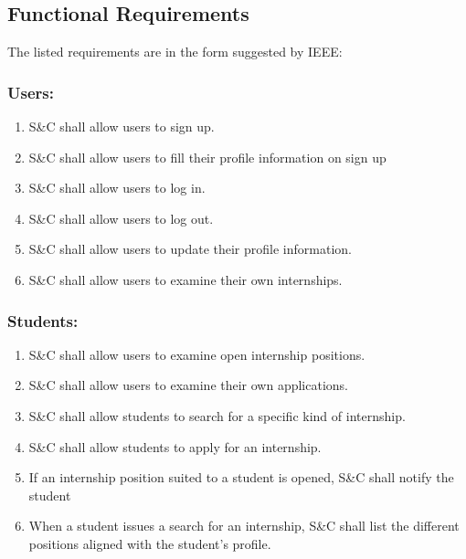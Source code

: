 \subsection{Functional Requirements}
    The listed requirements are in the form suggested by IEEE\cite{502838}: 
    \newline
    \subsubsection*{Users:}
        \begin{enumerate}[label=\textbf{R\arabic*}]
            \item S\&C shall allow users to sign up.                  
            \item S\&C shall allow users to fill their profile information on sign up
            \item S\&C shall allow users to log in.                   
            \item S\&C shall allow users to log out.                  
            \item S\&C shall allow users to update their profile information.      
            \item S\&C shall allow users to examine their own internships.
            \end{enumerate}
        
    \subsubsection*{Students:}
        \begin{enumerate}[label=\textbf{R\arabic*},resume]
            \item S\&C shall allow users to examine open internship positions. %
            \item S\&C shall allow users to examine their own applications.
            \item S\&C shall allow students to search for a specific kind of internship.  
            \item S\&C shall allow students to apply for an internship.    
            \item If an internship position suited to a student is opened, S\&C shall notify the student
            \item When a student issues a search for an internship, S\&C shall list the different positions aligned with the student's profile.         
        \end{enumerate}
    
